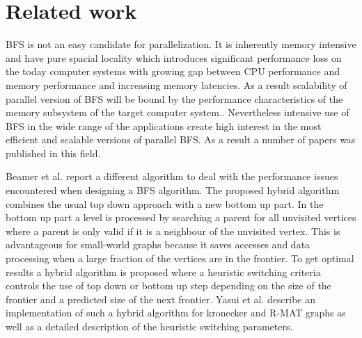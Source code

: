 \documentclass[letterpaper]{article}
\begin{document}

	\section{Related work} \label{sec:rewo} %
		BFS is not an easy candidate for parallelization.
		It is inherently memory intensive and have pure spacial locality which introduces significant performance loss on the today computer systems with growing gap between CPU performance and memory performance and increasing memory latencies.
		As a result scalability of parallel version of BFS will be bound by the performance characteristics of the memory subsystem of the target computer system.. 
		Nevertheless intensive use of BFS in the wide range of the applications create high interest in the most efficient and scalable versions of parallel BFS.
		As a result a number of papers was published in this field. 
		
		Beamer et al.\cite{beamer2011searching} report a different algorithm to deal with the performance issues encountered when designing a BFS algorithm. 
		The proposed hybrid algorithm combines the usual top down approach with a new bottom up part. 
		In the bottom up part a level is processed by searching a parent for all unvisited vertices where a parent is only valid if it is a neighbour of the unvisited vertex. 
		This is advantageous for small-world graphs because it saves accesses and data processing when a large fraction of the vertices are in the frontier. 
		To get optimal results a hybrid algorithm is proposed where a heuristic switching criteria controls the use of top down or bottom up step depending on the size of the frontier and a predicted size of the next frontier. 
		Yasui et al.\cite{6691600} describe an implementation of such a hybrid algorithm for kronecker and R-MAT graphs as well as a detailed description of the heuristic switching parameters.
	
\end{document}
